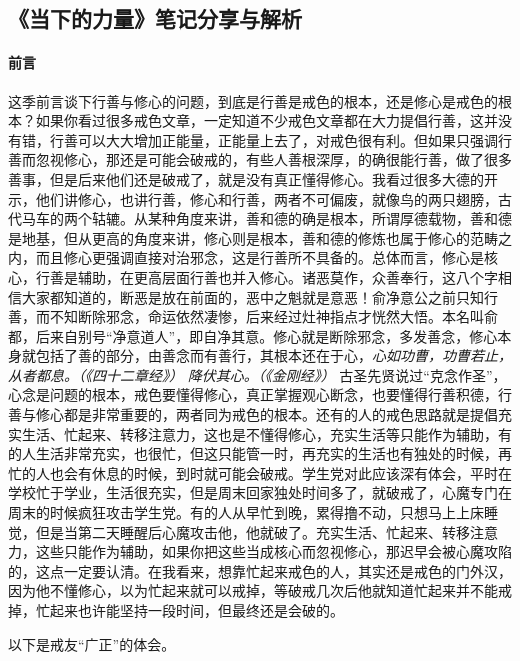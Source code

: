 \subsection{《当下的力量》笔记分享与解析}

\paragraph*{前言}

这季前言谈下行善与修心的问题，到底是行善是戒色的根本，还是修心是戒色的根本？如果你看过很多戒色文章，一定知道不少戒色文章都在大力提倡行善，这并没有错，行善可以大大增加正能量，正能量上去了，对戒色很有利。但如果只强调行善而忽视修心，那还是可能会破戒的，有些人善根深厚，的确很能行善，做了很多善事，但是后来他们还是破戒了，就是没有真正懂得修心。我看过很多大德的开示，他们讲修心，也讲行善，修心和行善，两者不可偏废，就像鸟的两只翅膀，古代马车的两个轱辘。从某种角度来讲，善和德的确是根本，所谓厚德载物，善和德是地基，但从更高的角度来讲，修心则是根本，善和德的修炼也属于修心的范畴之内，而且修心更强调直接对治邪念，这是行善所不具备的。总体而言，修心是核心，行善是辅助，在更高层面行善也并入修心。诸恶莫作，众善奉行，这八个字相信大家都知道的，断恶是放在前面的，恶中之魁就是意恶！俞净意公之前只知行善，而不知断除邪念，命运依然凄惨，后来经过灶神指点才恍然大悟。本名叫俞都，后来自别号“净意道人”，即自净其意。修心就是断除邪念，多发善念，修心本身就包括了善的部分，由善念而有善行，其根本还在于心，\textit{心如功曹，功曹若止，从者都息。（《四十二章经》）} \textit{降伏其心。（《金刚经》）} 古圣先贤说过“克念作圣”，心念是问题的根本，戒色要懂得修心，真正掌握观心断念，也要懂得行善积德，行善与修心都是非常重要的，两者同为戒色的根本。还有的人的戒色思路就是提倡充实生活、忙起来、转移注意力，这也是不懂得修心，充实生活等只能作为辅助，有的人生活非常充实，也很忙，但这只能管一时，再充实的生活也有独处的时候，再忙的人也会有休息的时候，到时就可能会破戒。学生党对此应该深有体会，平时在学校忙于学业，生活很充实，但是周末回家独处时间多了，就破戒了，心魔专门在周末的时候疯狂攻击学生党。有的人从早忙到晚，累得撸不动，只想马上上床睡觉，但是当第二天睡醒后心魔攻击他，他就破了。充实生活、忙起来、转移注意力，这些只能作为辅助，如果你把这些当成核心而忽视修心，那迟早会被心魔攻陷的，这点一定要认清。在我看来，想靠忙起来戒色的人，其实还是戒色的门外汉，因为他不懂修心，以为忙起来就可以戒掉，等破戒几次后他就知道忙起来并不能戒掉，忙起来也许能坚持一段时间，但最终还是会破的。

以下是戒友“广正”的体会。

